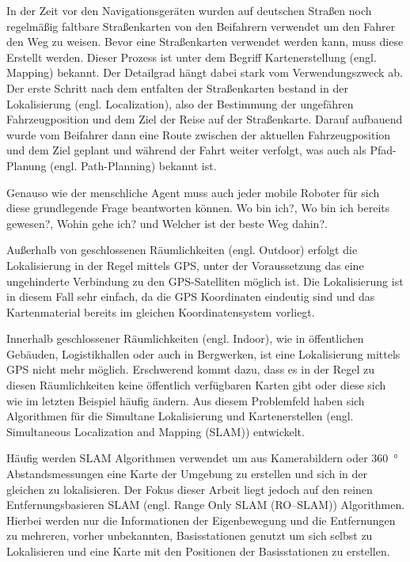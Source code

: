 In der Zeit vor den Navigationsgeräten wurden auf deutschen Straßen noch regelmäßig faltbare Straßenkarten von den Beifahrern verwendet um den Fahrer den Weg zu weisen. Bevor eine Straßenkarten verwendet werden kann, muss diese Erstellt werden. Dieser Prozess ist unter dem Begriff Kartenerstellung (engl. Mapping) bekannt. Der Detailgrad hängt dabei stark vom Verwendungszweck ab. Der erste Schritt nach dem entfalten der Straßenkarten bestand in der Lokalisierung (engl. Localization), also der Bestimmung der ungefähren Fahrzeugposition und dem Ziel der Reise auf der Straßenkarte. Darauf aufbauend wurde vom Beifahrer dann eine Route zwischen der aktuellen Fahrzeugposition und dem Ziel geplant und während der Fahrt weiter verfolgt, was auch als Pfad-Planung (engl. Path-Planning) bekannt ist.

Genauso wie der menschliche Agent muss auch jeder mobile Roboter für sich diese grundlegende Frage beantworten können. \glqq Wo bin ich?\grqq{}, \glqq Wo bin ich bereits gewesen?\grqq, \glqq Wohin gehe ich?\grqq{} und \glqq Welcher ist der beste Weg dahin?\grqq{}\cite{murphy2000introduction}.

Außerhalb von geschlossenen Räumlichkeiten (engl. Outdoor) erfolgt die Lokalisierung in der Regel mittels GPS, unter der Voraussetzung das eine ungehinderte Verbindung zu den GPS-Satelliten möglich ist. Die Lokalisierung ist in diesem Fall sehr einfach, da die GPS Koordinaten eindeutig sind und das Kartenmaterial bereits im gleichen Koordinatensystem vorliegt.

Innerhalb geschlossener Räumlichkeiten (engl. Indoor), wie in öffentlichen Gebäuden, Logistikhallen oder auch in Bergwerken, ist eine Lokalisierung mittels GPS nicht mehr möglich. Erschwerend kommt dazu, dass es in der Regel zu diesen Räumlichkeiten keine öffentlich verfügbaren Karten gibt oder diese sich wie im letzten Beispiel häufig ändern. Aus diesem Problemfeld haben sich Algorithmen für die Simultane Lokalisierung und Kartenerstellen (engl. Simultaneous Localization and Mapping (SLAM)) entwickelt.

Häufig werden SLAM Algorithmen verwendet um aus Kamerabildern oder \SI{360}{\degree} Abstandsmessungen eine Karte der Umgebung zu erstellen und sich in der gleichen zu lokalisieren. Der Fokus dieser Arbeit liegt jedoch auf den reinen Entfernungsbasieren SLAM (engl. Range Only SLAM (RO--SLAM)) Algorithmen. Hierbei werden nur die Informationen der Eigenbewegung und die Entfernungen zu mehreren, vorher unbekannten, Basisstationen genutzt um sich selbst zu Lokalisieren und eine Karte mit den Positionen der Basisstationen zu erstellen.